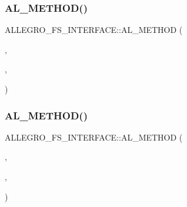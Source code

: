 \mbox{\label{struct_a_l_l_e_g_r_o___f_s___i_n_t_e_r_f_a_c_e_a238a83650c1e5db99815f67fff1268c8}} 
\subsubsection{\texorpdfstring{A\+L\+\_\+\+M\+E\+T\+H\+O\+D()}{AL\_METHOD()}\hspace{0.1cm}{\footnotesize\ttfamily [15/20]}}
{\footnotesize\ttfamily A\+L\+L\+E\+G\+R\+O\+\_\+\+F\+S\+\_\+\+I\+N\+T\+E\+R\+F\+A\+C\+E\+::\+A\+L\+\_\+\+M\+E\+T\+H\+OD (\begin{DoxyParamCaption}\item[{\hyperlink{astdbool_8h_abb452686968e48b67397da5f97445f5b}{bool}}]{,  }\item[{fs\+\_\+filename\+\_\+exists}]{,  }\item[{(\hyperlink{zconf_8h_a2c212835823e3c54a8ab6d95c652660e}{const} char $\ast$\hyperlink{group___library_merger_ga79bd92474fc256263841144176127d9b}{path})}]{ }\end{DoxyParamCaption})}

\mbox{\label{struct_a_l_l_e_g_r_o___f_s___i_n_t_e_r_f_a_c_e_a4ece5fba8506ea11ffaaa3cb486f08ac}} 
\subsubsection{\texorpdfstring{A\+L\+\_\+\+M\+E\+T\+H\+O\+D()}{AL\_METHOD()}\hspace{0.1cm}{\footnotesize\ttfamily [16/20]}}
{\footnotesize\ttfamily A\+L\+L\+E\+G\+R\+O\+\_\+\+F\+S\+\_\+\+I\+N\+T\+E\+R\+F\+A\+C\+E\+::\+A\+L\+\_\+\+M\+E\+T\+H\+OD (\begin{DoxyParamCaption}\item[{\hyperlink{astdbool_8h_abb452686968e48b67397da5f97445f5b}{bool}}]{,  }\item[{fs\+\_\+remove\+\_\+filename}]{,  }\item[{(\hyperlink{zconf_8h_a2c212835823e3c54a8ab6d95c652660e}{const} char $\ast$\hyperlink{group___library_merger_ga79bd92474fc256263841144176127d9b}{path})}]{ }\end{DoxyParamCaption})}

